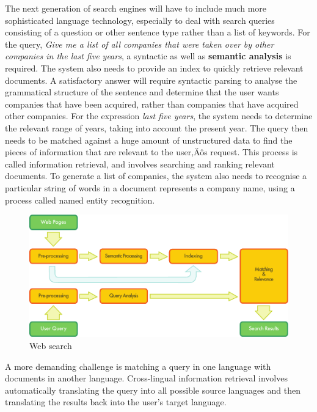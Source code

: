 \begin{multicols}{2}
The next generation of search engines will have to include much more
sophisticated language technology, especially to deal with search
queries consisting of a question or other sentence type rather than a
list of keywords. For the query, \textit{Give me a list of all
  companies that were taken over by other companies in the last five
  years}, a syntactic as well as \textbf{semantic analysis} is
required. The system also needs to provide an index to quickly
retrieve relevant documents. A satisfactory answer will require
syntactic parsing to analyse the grammatical structure of the sentence
and determine that the user wants companies that have been acquired,
rather than companies that have acquired other companies. For the
expression \textit{last five years}, the system needs to determine the
relevant range of years, taking into account the present year. The
query then needs to be matched against a huge amount of unstructured
data to find the pieces of information that are relevant to the user‚Äôs
request. This process is called information retrieval, and involves
searching and ranking relevant documents. To generate a list of
companies, the system also needs to recognise a particular string of
words in a document represents a company name, using a process called
named entity recognition.


\begin{figure}[htb]
  \center
  \includegraphics[width=\textwidth]{../_media/english/web_search_architecture}
  \caption{Web search}
\label{fig:websearcharch_en}
 \end{figure}

A more demanding challenge is matching a query in one language with
documents in another language. Cross-lingual information retrieval
involves automatically translating the query into all possible source
languages and then translating the results back into the user's target
language.
 

\end{multicols}
